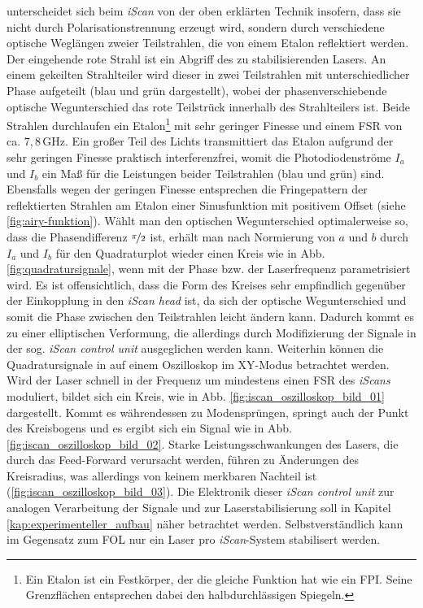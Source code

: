 unterscheidet sich beim \textit{iScan} von der oben erklärten Technik insofern,
dass sie nicht durch Polarisationstrennung erzeugt wird, sondern durch
verschiedene optische Weglängen zweier Teilstrahlen, die von einem Etalon
reflektiert werden. Der eingehende rote Strahl ist ein Abgriff des zu
stabilisierenden Lasers. An einem gekeilten Strahlteiler wird dieser in zwei
Teilstrahlen mit unterschiedlicher Phase aufgeteilt (blau und grün dargestellt),
wobei der phasenverschiebende optische Wegunterschied das rote Teilstrück
innerhalb des Strahlteilers ist. Beide Strahlen durchlaufen ein Etalon\footnote{Ein Etalon
ist ein Festkörper, der die gleiche Funktion hat wie ein FPI. Seine Grenzflächen
entsprechen dabei den halbdurchlässigen Spiegeln.} mit sehr geringer Finesse und
einem FSR von ca. $7,8\,$GHz. Ein großer Teil des Lichts transmittiert das
Etalon aufgrund der sehr geringen Finesse praktisch interferenzfrei, womit die
Photodiodenströme $I_a$ und $I_b$ ein Maß für die Leistungen beider Teilstrahlen
(blau und grün) sind. Ebensfalls wegen der geringen Finesse entsprechen die
Fringepattern der reflektierten Strahlen am Etalon einer Sinusfunktion mit
positivem Offset (siehe \ref{fig:airy-funktion}). Wählt man den optischen
Wegunterschied optimalerweise so, dass die Phasendifferenz $\nicefrac{\pi}{2}$
ist, erhält man nach Normierung von $a$ und $b$ durch $I_a$ und $I_b$ für den Quadraturplot
wieder einen Kreis wie in Abb. \ref{fig:quadratursignale}, wenn mit der Phase
bzw. der Laserfrequenz parametrisiert wird. Es ist offensichtlich, dass die Form
des Kreises sehr empfindlich gegenüber der Einkopplung in den \textit{iScan
head} ist, da sich der optische Wegunterschied und somit die Phase zwischen den
Teilstrahlen leicht ändern kann. Dadurch kommt es zu einer elliptischen
Verformung, die allerdings durch Modifizierung der Signale in der sog.
\textit{iScan control unit} \cite{iscan_hardware_guide} ausgeglichen werden
kann. Weiterhin können die Quadratursignale in auf einem Oszilloskop im XY-Modus
betrachtet werden. Wird der Laser schnell in der Frequenz um mindestens einen
FSR des \textit{iScans} moduliert, bildet sich ein Kreis, wie in Abb.
\ref{fig:iscan_oszilloskop_bild_01} dargestellt. Kommt es währendessen zu
Modensprüngen, springt auch der Punkt des Kreisbogens und es ergibt sich ein
Signal wie in Abb. \ref{fig:iscan_oszilloskop_bild_02}. Starke
Leistungsschwankungen des Lasers, die durch das Feed-Forward verursacht werden,
führen zu Änderungen des Kreisradius, was allerdings von keinem merkbaren
Nachteil ist (\ref{fig:iscan_oszilloskop_bild_03}). Die Elektronik dieser
\textit{iScan control unit} zur analogen Verarbeitung der Signale und zur
Laserstabilisierung soll in Kapitel \ref{kap:experimenteller_aufbau} näher betrachtet werden.
Selbstverständlich kann im Gegensatz zum FOL nur ein Laser pro
\textit{iScan}-System stabilisert werden.

